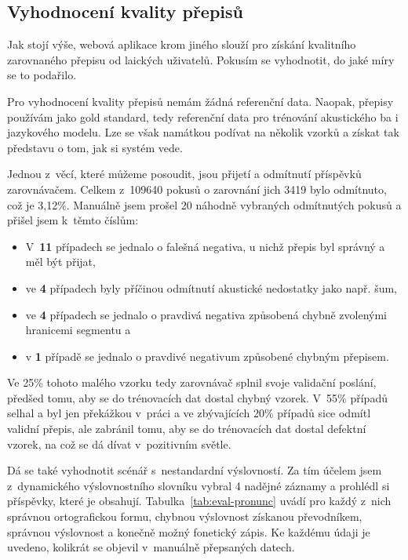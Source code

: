 \subsection{Vyhodnocení kvality přepisů}

Jak stojí výše, webová aplikace krom jiného slouží pro získání kvalitního
zarovnaného přepisu od laických uživatelů. Pokusím se vyhodnotit, do jaké míry
se to podařilo.

Pro vyhodnocení kvality přepisů nemám žádná referenční data. Naopak, přepisy
používám jako gold standard, tedy referenční data pro trénování akustického ba i
jazykového modelu. Lze se však namátkou podívat na několik vzorků a získat tak
představu o tom, jak si systém vede.

Jednou z~věcí, které můžeme posoudit, jsou přijetí a odmítnutí příspěvků
zarovnávačem. Celkem z~109640 pokusů o zarovnání jich 3419 bylo odmítnuto, což
je 3,12\%. Manuálně jsem prošel 20 náhodně vybraných odmítnutých pokusů a
přišel jsem k~těmto číslům:
\begin{itemize}
\item{
    V~\textbf{11} případech se jednalo o falešná negativa, u nichž přepis byl
    správný a měl být přijat,
}
\item{
    ve \textbf{4} případech byly příčinou odmítnutí akustické nedostatky jako
    např. šum,
}
\item{
    ve \textbf{4} případech se jednalo o pravdivá negativa způsobená chybně
    zvolenými hranicemi segmentu a
}
\item{
     v \textbf{1} případě se jednalo o pravdivé negativum způsobené chybným
    přepisem.
}
\end{itemize}

Ve 25\% tohoto malého vzorku tedy zarovnávač splnil svoje validační
poslání, předšed tomu, aby se do trénovacích dat dostal chybný vzorek. V~55\%
případů selhal a byl jen překážkou v~práci a ve zbývajících 20\%
případů sice odmítl validní přepis, ale zabránil tomu, aby se do trénovacích dat
dostal defektní vzorek, na což se dá dívat v~pozitivním světle.

Dá se také vyhodnotit scénář s~nestandardní výslovností. Za tím účelem jsem
z~dynamického výslovnostního slovníku vybral 4 nadějné záznamy a prohlédl si
příspěvky, které je obsahují. Tabulka~\ref{tab:eval-pronunc} uvádí pro každý
z~nich správnou ortografickou formu, chybnou výslovnost získanou převodníkem,
správnou výslovnost a konečně možný fonetický zápis. Ke každému údaji je uvedeno,
kolikrát se objevil v~manuálně přepsaných datech.

